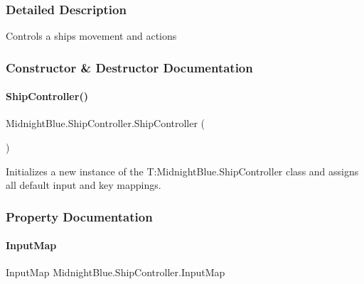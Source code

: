 \subsubsection{Detailed Description}
Controls a ships movement and actions 



\subsubsection{Constructor \& Destructor Documentation}
\hypertarget{class_midnight_blue_1_1_ship_controller_a07d38d2b98b9b132f1eff9cc8879f278}{}\label{class_midnight_blue_1_1_ship_controller_a07d38d2b98b9b132f1eff9cc8879f278} 
\paragraph{\texorpdfstring{Ship\+Controller()}{ShipController()}}
{\footnotesize\ttfamily Midnight\+Blue.\+Ship\+Controller.\+Ship\+Controller (\begin{DoxyParamCaption}{ }\end{DoxyParamCaption})\hspace{0.3cm}{\ttfamily [inline]}}



Initializes a new instance of the T\+:\+Midnight\+Blue.\+Ship\+Controller class and assigns all default input and key mappings. 



\subsubsection{Property Documentation}
\hypertarget{class_midnight_blue_1_1_ship_controller_a50136c59b5a0e80d280aec4b6de46414}{}\label{class_midnight_blue_1_1_ship_controller_a50136c59b5a0e80d280aec4b6de46414} 
\paragraph{\texorpdfstring{Input\+Map}{InputMap}}
{\footnotesize\ttfamily Input\+Map Midnight\+Blue.\+Ship\+Controller.\+Input\+Map\hspace{0.3cm}{\ttfamily [get]}}



